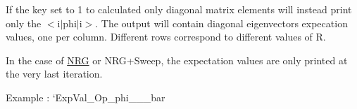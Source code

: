 \begin{DoxyItemize}
If the key {\ttfamily set to 1 to calculated only diagonal matrix elements} will instead print only the $<$i$\vert$phi$\vert$i$>$. The output will contain diagonal eigenvectors expecation values, one per column. Different rows correspond to different values of R.

In the case of \mbox{\hyperlink{classNRG}{N\+RG}} or N\+R\+G+\+Sweep, the expectation values are only printed at the very last iteration.

Example \+: `\+Exp\+Val\+\_\+\+Op\+\_\+phi\+\_\+\_\+\_\+bar 
\end{DoxyItemize}